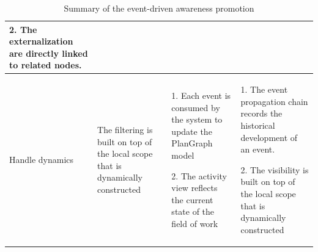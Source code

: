 \begin{table}[htbp]
\begin{tabular}{>{\raggedright}p{0.8in}>{\raggedright}p{1.5in}>{\raggedright}p{1.5in}>{\raggedright}p{1.7in}}
2. The externalization are directly linked to related nodes.\tabularnewline
\midrule 
Handle dynamics & The filtering is built on top of the local scope that is dynamically
constructed & 1. Each event is consumed by the system to update the PlanGraph model

2. The activity view reflects the current state of the field of work & 1. The event propagation chain records the historical development
of an event.

2. The visibility is built on top of the local scope that is dynamically
constructed\tabularnewline
\bottomrule


\end{tabular}	
\caption{Summary of the event-driven awareness promotion}
\label{tab:summary_awareness_promotion}
\end{table}







 

